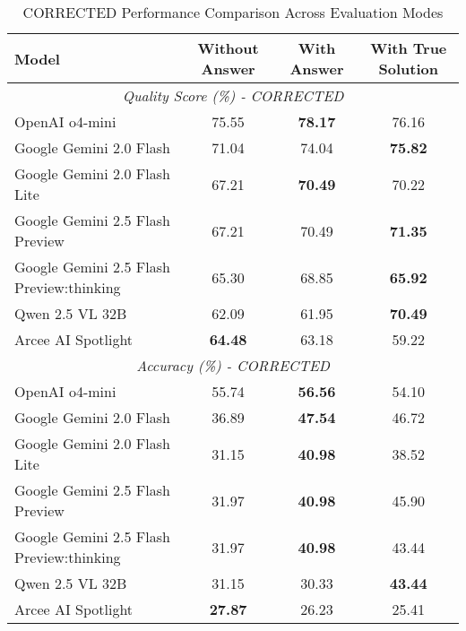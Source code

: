\documentclass{article}
\begin{document}
\begin{table}[htbp]
\centering
\caption{CORRECTED Performance Comparison Across Evaluation Modes}
\label{tab:evaluation_modes_corrected}
\begin{tabular}{@{}lccc@{}}
\toprule
\textbf{Model} & \textbf{Without Answer} & \textbf{With Answer} & \textbf{With True Solution} \\
\midrule
\multicolumn{4}{c}{\textit{Quality Score (\%) - CORRECTED}} \\
\midrule
OpenAI o4-mini & 75.55 & \textbf{78.17} & 76.16 \\
Google Gemini 2.0 Flash & 71.04 & 74.04 & \textbf{75.82} \\
Google Gemini 2.0 Flash Lite & 67.21 & \textbf{70.49} & 70.22 \\
Google Gemini 2.5 Flash Preview & 67.21 & 70.49 & \textbf{71.35} \\
Google Gemini 2.5 Flash Preview:thinking & 65.30 & 68.85 & \textbf{65.92} \\
Qwen 2.5 VL 32B & 62.09 & 61.95 & \textbf{70.49} \\
Arcee AI Spotlight & \textbf{64.48} & 63.18 & 59.22 \\
\midrule
\multicolumn{4}{c}{\textit{Accuracy (\%) - CORRECTED}} \\
\midrule
OpenAI o4-mini & 55.74 & \textbf{56.56} & 54.10 \\
Google Gemini 2.0 Flash & 36.89 & \textbf{47.54} & 46.72 \\
Google Gemini 2.0 Flash Lite & 31.15 & \textbf{40.98} & 38.52 \\
Google Gemini 2.5 Flash Preview & 31.97 & \textbf{40.98} & 45.90 \\
Google Gemini 2.5 Flash Preview:thinking & 31.97 & \textbf{40.98} & 43.44 \\
Qwen 2.5 VL 32B & 31.15 & 30.33 & \textbf{43.44} \\
Arcee AI Spotlight & \textbf{27.87} & 26.23 & 25.41 \\
\bottomrule
\end{tabular}
\end{table}
\end{document}
